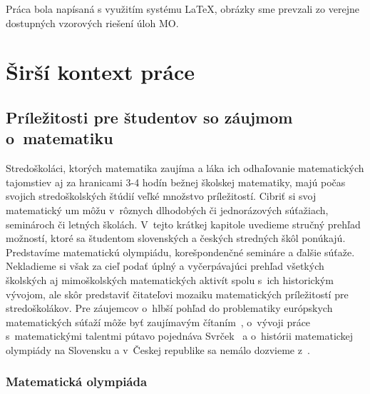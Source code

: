 Práca bola napísaná s využitím systému \LaTeX, obrázky sme prevzali zo verejne dostupných vzorových riešení úloh MO.


\cleardoublepage

\renewcommand{\chaptermark}[1]{\markboth{\thechapter. #1}{}}
\renewcommand{\sectionmark}[1]{\markright{\thesection. #1}{}}
\HlavickaKapitoly
\chapter{Širší kontext práce}
\section{Príležitosti pre študentov so záujmom o~matematiku}

Stredoškoláci, ktorých matematika zaujíma a láka ich odhaľovanie matematických tajomstiev aj za hranicami 3-4 hodín bežnej školskej matematiky, majú počas svojich stredoškolských štúdií veľké množstvo príležitostí. Cibriť si svoj matematický um môžu v~rôznych dlhodobých či jednorázových súťažiach, seminároch či letných školách. V~tejto krátkej kapitole uvedieme stručný prehľad možností, ktoré sa študentom slovenských a českých stredných škôl ponúkajú. Predstavíme matematickú olympiádu, korešpondenčné semináre a ďalšie súťaže. Nekladieme si však za cieľ podať úplný a vyčerpávajúci prehľad všetkých školských aj mimoškolských matematických aktivít spolu s~ich historickým vývojom, ale skôr predstaviť čitateľovi mozaiku matematických príležitostí pre stredoškolákov. Pre záujemcov o~hlbší pohľad do problematiky európskych matematických súťaží môže byť zaujímavým čítaním~\cite{huv},  o~vývoji práce s~matematickými talentmi pútavo pojednáva Svrček~\cite{svrcek2014} a o~histórii matematickej olympiády na Slovensku a v~Českej republike sa nemálo dozvieme z~\cite{dos}.


\subsection*{Matematická olympiáda}

